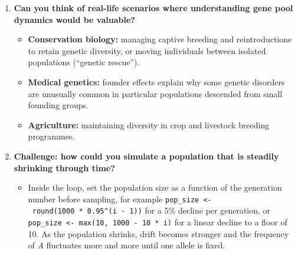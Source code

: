\documentclass[
  a4paper]{book}
\providecommand{\tightlist}{%
  \setlength{\itemsep}{0pt}\setlength{\parskip}{0pt}}
\begin{document}
\begin{enumerate}
\begin{itemize}
    \begin{itemize}
    \tightlist
    \item
      \textbf{Resilience to diseases:} a genetically diverse population is less likely to be wiped out by a single disease, as some individuals might have resistance.
    \item
      \textbf{Adaptation to changing environments:} diversity provides the variation that selection needs if conditions change.
    \item
      \textbf{Reduced inbreeding:} high genetic diversity reduces the chance that individuals inherit two copies of harmful recessive alleles, which lowers fitness (inbreeding depression).
    \item
      \textbf{Long-term survival:} small populations lose diversity through drift, which is why conservation programmes try to keep populations large and connected.
    \end{itemize}
  \end{itemize}
\item
  \textbf{Can you think of real-life scenarios where understanding gene pool dynamics would be valuable?}

  \begin{itemize}
  \tightlist
  \item
    \textbf{Conservation biology:} managing captive breeding and reintroductions to retain genetic diversity, or moving individuals between isolated populations (``genetic rescue'').
  \item
    \textbf{Medical genetics:} founder effects explain why some genetic disorders are unusually common in particular populations descended from small founding groups.
  \item
    \textbf{Agriculture:} maintaining diversity in crop and livestock breeding programmes.
  \end{itemize}
\item
  \textbf{Challenge: how could you simulate a population that is steadily shrinking through time?}

  \begin{itemize}
  \tightlist
  \item
    Inside the loop, set the population size as a function of the generation number before sampling, for example \texttt{pop\_size\ \textless{}-\ round(1000\ *\ 0.95\^{}(i\ -\ 1))} for a 5\% decline per generation, or \texttt{pop\_size\ \textless{}-\ max(10,\ 1000\ -\ 10\ *\ i)} for a linear decline to a floor of 10. As the population shrinks, drift becomes stronger and the frequency of \emph{A} fluctuates more and more until one allele is fixed.
  \end{itemize}
\end{enumerate}
\end{document}
